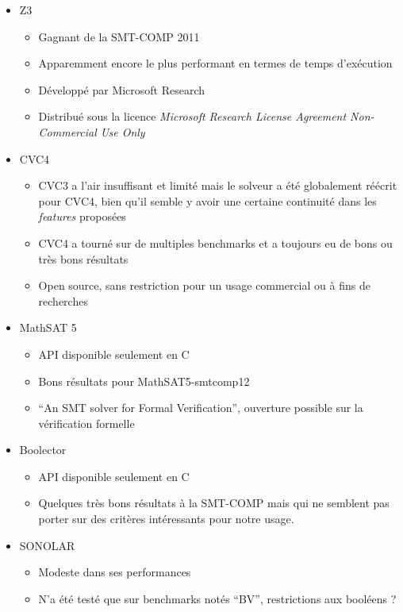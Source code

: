 \documentclass[french]{article}
\begin{document}
  \begin{itemize}
    \item Z3~\cite{smt_z3}
    \begin{itemize}
      \item Gagnant de la SMT-COMP 2011
      \item Apparemment encore le plus performant en termes de temps d'exécution
      \item Développé par Microsoft Research
      \item Distribué sous la licence \textit{Microsoft Research License Agreement Non-Commercial Use Only}
    \end{itemize}
    \item CVC4~\cite{smt_cvc4}
    \begin{itemize}
      \item CVC3 a l'air insuffisant et limité mais le solveur a été globalement réécrit pour CVC4, bien qu'il semble y avoir une certaine continuité dans les \textit{features} proposées
      \item CVC4 a tourné sur de multiples benchmarks et a toujours eu de bons ou très bons résultats
      \item Open source, sans restriction pour un usage commercial ou à fins de recherches
    \end{itemize}
    \item MathSAT 5~\cite{smt_mathsat5}
    \begin{itemize}
      \item API disponible seulement en C
      \item Bons résultats pour MathSAT5-smtcomp12
      \item ``An SMT solver for Formal Verification'', ouverture possible sur la vérification formelle
    \end{itemize}
    \item Boolector~\cite{smt_boolector}
    \begin{itemize}
      \item API disponible seulement en C
      \item Quelques très bons résultats à la SMT-COMP mais qui ne semblent pas porter sur des critères intéressants pour notre usage.
    \end{itemize}
    \item SONOLAR~\cite{smt_sonolar}
    \begin{itemize}
      \item Modeste dans ses performances
      \item N'a été testé que sur benchmarks notés ``BV'', restrictions aux booléens ?

\end{itemize}
\end{itemize}
\end{document}
